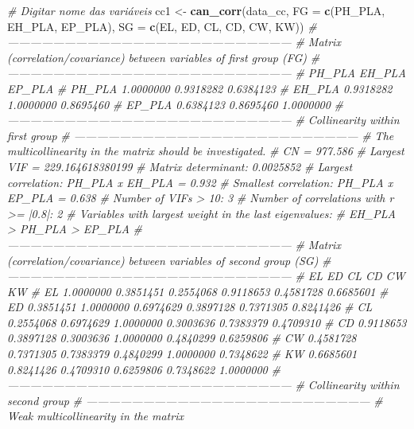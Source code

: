 \documentclass[
]{book}
\newenvironment{Shaded}{\begin{snugshade}}{\end{snugshade}}
\newcommand{\CommentTok}[1]{\textcolor[rgb]{0.56,0.35,0.01}{\textit{#1}}}
\newcommand{\DataTypeTok}[1]{\textcolor[rgb]{0.13,0.29,0.53}{#1}}
\newcommand{\KeywordTok}[1]{\textcolor[rgb]{0.13,0.29,0.53}{\textbf{#1}}}
\newcommand{\NormalTok}[1]{#1}
\newcommand{\StringTok}[1]{\textcolor[rgb]{0.31,0.60,0.02}{#1}}
\begin{document}
\begin{Shaded}
\begin{Highlighting}[]
\CommentTok{# Digitar nome das variáveis}
\NormalTok{cc1 <-}\StringTok{ }
\StringTok{  }\KeywordTok{can_corr}\NormalTok{(data_cc,}
           \DataTypeTok{FG =} \KeywordTok{c}\NormalTok{(PH_PLA, EH_PLA, EP_PLA),}
           \DataTypeTok{SG =} \KeywordTok{c}\NormalTok{(EL, ED, CL, CD, CW, KW))}
\CommentTok{# ---------------------------------------------------------------------------}
\CommentTok{# Matrix (correlation/covariance) between variables of first group (FG)}
\CommentTok{# ---------------------------------------------------------------------------}
\CommentTok{#           PH_PLA    EH_PLA    EP_PLA}
\CommentTok{# PH_PLA 1.0000000 0.9318282 0.6384123}
\CommentTok{# EH_PLA 0.9318282 1.0000000 0.8695460}
\CommentTok{# EP_PLA 0.6384123 0.8695460 1.0000000}
\CommentTok{# ---------------------------------------------------------------------------}
\CommentTok{# Collinearity within first group }
\CommentTok{# ---------------------------------------------------------------------------}
\CommentTok{# The multicollinearity in the matrix should be investigated.}
\CommentTok{# CN = 977.586}
\CommentTok{# Largest VIF = 229.164618380199}
\CommentTok{# Matrix determinant: 0.0025852 }
\CommentTok{# Largest correlation: PH_PLA x EH_PLA = 0.932 }
\CommentTok{# Smallest correlation: PH_PLA x EP_PLA = 0.638 }
\CommentTok{# Number of VIFs > 10: 3 }
\CommentTok{# Number of correlations with r >= |0.8|: 2 }
\CommentTok{# Variables with largest weight in the last eigenvalues: }
\CommentTok{# EH_PLA > PH_PLA > EP_PLA }
\CommentTok{# ---------------------------------------------------------------------------}
\CommentTok{# Matrix (correlation/covariance) between variables of second group (SG)}
\CommentTok{# ---------------------------------------------------------------------------}
\CommentTok{#           EL        ED        CL        CD        CW        KW}
\CommentTok{# EL 1.0000000 0.3851451 0.2554068 0.9118653 0.4581728 0.6685601}
\CommentTok{# ED 0.3851451 1.0000000 0.6974629 0.3897128 0.7371305 0.8241426}
\CommentTok{# CL 0.2554068 0.6974629 1.0000000 0.3003636 0.7383379 0.4709310}
\CommentTok{# CD 0.9118653 0.3897128 0.3003636 1.0000000 0.4840299 0.6259806}
\CommentTok{# CW 0.4581728 0.7371305 0.7383379 0.4840299 1.0000000 0.7348622}
\CommentTok{# KW 0.6685601 0.8241426 0.4709310 0.6259806 0.7348622 1.0000000}
\CommentTok{# ---------------------------------------------------------------------------}
\CommentTok{# Collinearity within second group }
\CommentTok{# ---------------------------------------------------------------------------}
\CommentTok{# Weak multicollinearity in the matrix}

\end{Highlighting}
\end{Shaded}
\end{document}
